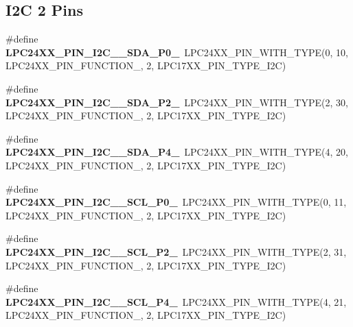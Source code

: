 \subsection*{I2C 2 Pins}
\begin{DoxyCompactItemize}
\item 
\mbox{\label{group__lpc24xx__io_gafea58051d22ec108142dc30879b33b4c}} 
\#define {\bfseries L\+P\+C24\+X\+X\+\_\+\+P\+I\+N\+\_\+\+I2\+C\+\_\+\_\+\+S\+D\+A\+\_\+\+P0\+\_}~L\+P\+C24\+X\+X\+\_\+\+P\+I\+N\+\_\+\+W\+I\+T\+H\+\_\+\+T\+Y\+PE(0, 10, L\+P\+C24\+X\+X\+\_\+\+P\+I\+N\+\_\+\+F\+U\+N\+C\+T\+I\+O\+N\+\_, 2, L\+P\+C17\+X\+X\+\_\+\+P\+I\+N\+\_\+\+T\+Y\+P\+E\+\_\+\+I2C)
\item 
\mbox{\label{group__lpc24xx__io_gaa653e37bf19d61433e744c8968df4e4d}} 
\#define {\bfseries L\+P\+C24\+X\+X\+\_\+\+P\+I\+N\+\_\+\+I2\+C\+\_\+\_\+\+S\+D\+A\+\_\+\+P2\+\_}~L\+P\+C24\+X\+X\+\_\+\+P\+I\+N\+\_\+\+W\+I\+T\+H\+\_\+\+T\+Y\+PE(2, 30, L\+P\+C24\+X\+X\+\_\+\+P\+I\+N\+\_\+\+F\+U\+N\+C\+T\+I\+O\+N\+\_, 2, L\+P\+C17\+X\+X\+\_\+\+P\+I\+N\+\_\+\+T\+Y\+P\+E\+\_\+\+I2C)
\item 
\mbox{\label{group__lpc24xx__io_gacb4a9231848d991780f52066daabede4}} 
\#define {\bfseries L\+P\+C24\+X\+X\+\_\+\+P\+I\+N\+\_\+\+I2\+C\+\_\+\_\+\+S\+D\+A\+\_\+\+P4\+\_}~L\+P\+C24\+X\+X\+\_\+\+P\+I\+N\+\_\+\+W\+I\+T\+H\+\_\+\+T\+Y\+PE(4, 20, L\+P\+C24\+X\+X\+\_\+\+P\+I\+N\+\_\+\+F\+U\+N\+C\+T\+I\+O\+N\+\_, 2, L\+P\+C17\+X\+X\+\_\+\+P\+I\+N\+\_\+\+T\+Y\+P\+E\+\_\+\+I2C)
\item 
\mbox{\label{group__lpc24xx__io_ga7f062cf9ac1e8ff4db993bd076adce58}} 
\#define {\bfseries L\+P\+C24\+X\+X\+\_\+\+P\+I\+N\+\_\+\+I2\+C\+\_\+\_\+\+S\+C\+L\+\_\+\+P0\+\_}~L\+P\+C24\+X\+X\+\_\+\+P\+I\+N\+\_\+\+W\+I\+T\+H\+\_\+\+T\+Y\+PE(0, 11, L\+P\+C24\+X\+X\+\_\+\+P\+I\+N\+\_\+\+F\+U\+N\+C\+T\+I\+O\+N\+\_, 2, L\+P\+C17\+X\+X\+\_\+\+P\+I\+N\+\_\+\+T\+Y\+P\+E\+\_\+\+I2C)
\item 
\mbox{\label{group__lpc24xx__io_gac0b892cf5d57b93e792011cc2facbffd}} 
\#define {\bfseries L\+P\+C24\+X\+X\+\_\+\+P\+I\+N\+\_\+\+I2\+C\+\_\+\_\+\+S\+C\+L\+\_\+\+P2\+\_}~L\+P\+C24\+X\+X\+\_\+\+P\+I\+N\+\_\+\+W\+I\+T\+H\+\_\+\+T\+Y\+PE(2, 31, L\+P\+C24\+X\+X\+\_\+\+P\+I\+N\+\_\+\+F\+U\+N\+C\+T\+I\+O\+N\+\_, 2, L\+P\+C17\+X\+X\+\_\+\+P\+I\+N\+\_\+\+T\+Y\+P\+E\+\_\+\+I2C)
\item 
\mbox{\label{group__lpc24xx__io_ga7a303b96b35bb2bc6f1c11a5c05751f3}} 
\#define {\bfseries L\+P\+C24\+X\+X\+\_\+\+P\+I\+N\+\_\+\+I2\+C\+\_\+\_\+\+S\+C\+L\+\_\+\+P4\+\_}~L\+P\+C24\+X\+X\+\_\+\+P\+I\+N\+\_\+\+W\+I\+T\+H\+\_\+\+T\+Y\+PE(4, 21, L\+P\+C24\+X\+X\+\_\+\+P\+I\+N\+\_\+\+F\+U\+N\+C\+T\+I\+O\+N\+\_, 2, L\+P\+C17\+X\+X\+\_\+\+P\+I\+N\+\_\+\+T\+Y\+P\+E\+\_\+\+I2C)
\end{DoxyCompactItemize}

